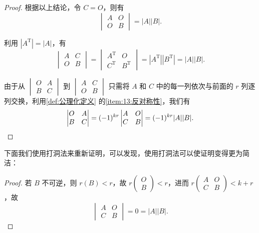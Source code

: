 \begin{enumerate}
\begin{proof}
            根据以上结论，令 $C = O$，则有
            \[
                \begin{vmatrix} A & O \\ O & B \end{vmatrix} = |A||B|.
            \]

            利用 $|A^\mathrm{T}|=|A|$，有
            \[
                \begin{vmatrix}
                    A & C \\ O & B
                \end{vmatrix} = \begin{vmatrix}
                    A^\mathrm{T} & O \\ C^\mathrm{T} & B^\mathrm{T}
                \end{vmatrix} = |A^\mathrm{T}||B^\mathrm{T}| = |A||B|.
            \]

            由于从 $\begin{vmatrix} O & A \\ B & C \end{vmatrix}$ 到 $\begin{vmatrix} A & C \\ O & B \end{vmatrix}$ 只需将 $A$ 和 $C$ 中的每一列依次与前面的 $r$ 列逐列交换，利用\autoref{def:公理化定义} 的\ref*{item:13:反对称性}，我们有
            \[
                \begin{vmatrix}
                    O & A \\ B & C
                \end{vmatrix} = (-1)^{kr} \begin{vmatrix}
                    A & O \\ C & B
                \end{vmatrix} = (-1)^{kr} |A||B|. \qedhere
            \]
          \end{proof}

          下面我们使用打洞法来重新证明，可以发现，使用打洞法可以使证明变得更为简洁：
          \begin{proof}
              若 $B$ 不可逆，则 $r(B) < r$，故 $r\begin{pmatrix} O \\ B \end{pmatrix} < r$，进而 $r\begin{pmatrix} A & O \\ C & B \end{pmatrix} < k + r$，故
              \[
                  \begin{vmatrix}
                      A & O \\ C & B
                  \end{vmatrix} = 0 = |A||B|.
              \]


\end{proof}
\end{enumerate}
